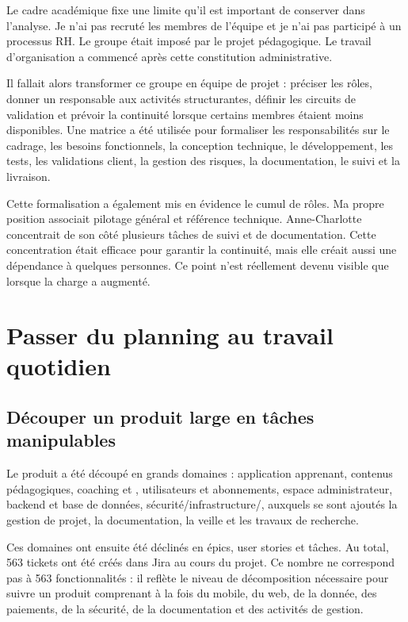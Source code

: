 Le cadre académique fixe une limite qu'il est important de conserver dans l'analyse. Je n'ai pas recruté les membres de l'équipe et je n'ai pas participé à un processus RH. Le groupe était imposé par le projet pédagogique. Le travail d'organisation a commencé après cette constitution administrative.

Il fallait alors transformer ce groupe en équipe de projet : préciser les rôles, donner un responsable aux activités structurantes, définir les circuits de validation et prévoir la continuité lorsque certains membres étaient moins disponibles. Une matrice  a été utilisée pour formaliser les responsabilités sur le cadrage, les besoins fonctionnels, la conception technique, le développement, les tests, les validations client, la gestion des risques, la documentation, le suivi et la livraison.

Cette formalisation a également mis en évidence le cumul de rôles. Ma propre position associait pilotage général et référence technique. Anne-Charlotte concentrait de son côté plusieurs tâches de suivi et de documentation. Cette concentration était efficace pour garantir la continuité, mais elle créait aussi une dépendance à quelques personnes. Ce point n'est réellement devenu visible que lorsque la charge a augmenté.

\section{Passer du planning au travail quotidien}

\subsection{Découper un produit large en tâches manipulables}

Le produit a été découpé en grands domaines : application apprenant, contenus pédagogiques, coaching et , utilisateurs et abonnements, espace administrateur, backend et base de données, sécurité/infrastructure/, auxquels se sont ajoutés la gestion de projet, la documentation, la veille et les travaux de recherche.

Ces domaines ont ensuite été déclinés en épics, user stories et tâches. Au total, 563 tickets ont été créés dans Jira au cours du projet. Ce nombre ne correspond pas à 563 fonctionnalités : il reflète le niveau de décomposition nécessaire pour suivre un produit comprenant à la fois du mobile, du web, de la donnée, des paiements, de la sécurité, de la documentation et des activités de gestion.

